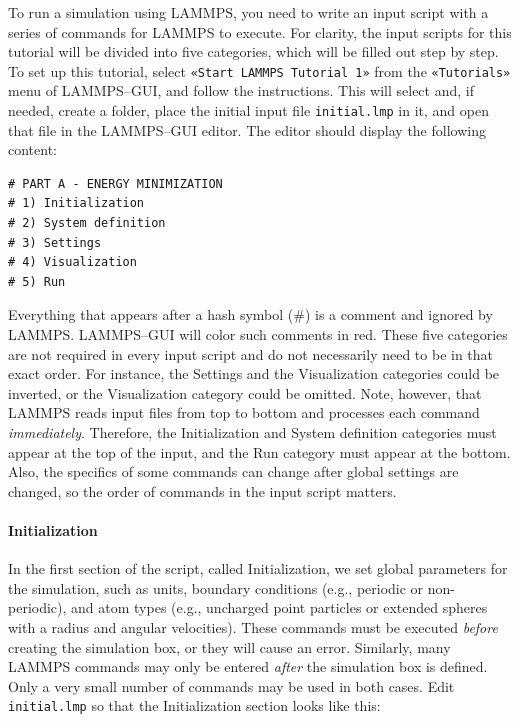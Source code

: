 \documentclass[9pt,tutorial]{livecoms}
\newcommand{\lmpcmd}[1]{\hspace{0pt}\colorbox{listing}{\textcolor{command}{\small{#1}}}\hspace{0pt}} %
\newcommand{\flecmd}[1]{\textcolor{command}{\texttt{#1}}} %
\newcommand{\guicmd}[1]{\textcolor{command}{\texttt{«#1»}}} %
\begin{document}
To run a simulation using LAMMPS, you need to write an input script with
a series of commands for LAMMPS to execute.  For clarity, the
input scripts for this tutorial will be divided into five categories,
which will be filled out step by step.  To set up this tutorial, select
\guicmd{Start LAMMPS Tutorial 1} from the \guicmd{Tutorials} menu of LAMMPS--GUI, and
follow the instructions.  This will select and, if needed, create a folder,
place the initial input file \flecmd{initial.lmp} in it, and
open that file in the LAMMPS--GUI editor.  The editor should display the
following content:
\begin{lstlisting}
# PART A - ENERGY MINIMIZATION
# 1) Initialization
# 2) System definition
# 3) Settings
# 4) Visualization
# 5) Run
\end{lstlisting}

Everything that appears after a hash symbol ($\#$) is a comment
and ignored by LAMMPS.  LAMMPS--GUI will color such comments in red.
These five categories are not required in every input script and do not
necessarily need to be in that exact order.  For instance, the \lmpcmd{Settings}
and the \lmpcmd{Visualization} categories could be inverted, or
the \lmpcmd{Visualization} category could be omitted.  Note, however, that
LAMMPS reads input files from top to bottom and processes each command
\emph{immediately}.  Therefore, the \lmpcmd{Initialization} and
\lmpcmd{System definition} categories must appear at the top of the
input, and the \lmpcmd{Run} category must appear at the bottom.  Also, the
specifics of some commands can change after global settings are changed, so the
order of commands in the input script matters.

\paragraph{Initialization}

In the first section of the script, called \lmpcmd{Initialization}, we
set global parameters for the simulation, such as units, boundary conditions
(e.g., periodic or non-periodic), and atom types (e.g., uncharged point particles
or extended spheres with a radius and angular velocities).  These commands must be
executed \emph{before} creating the simulation box, or they will cause
an error.  Similarly, many LAMMPS commands may only be
entered \emph{after} the simulation box is defined.  Only a very small
number of commands may be used in both cases.  Edit \flecmd{initial.lmp}
so that the \lmpcmd{Initialization} section looks like this:
\end{document}
